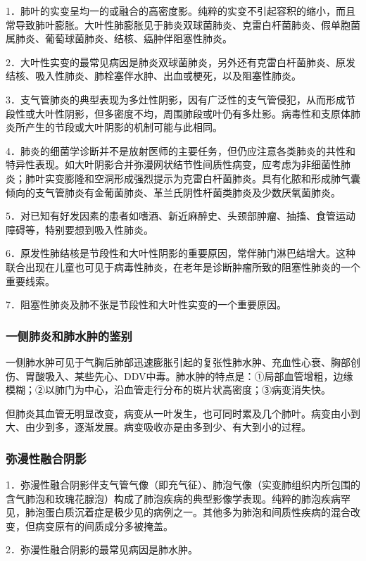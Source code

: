1．肺叶的实变呈均一的或融合的高密度影。纯粹的实变不引起容积的缩小，而且常导致肺叶膨胀。大叶性肺膨胀见于肺炎双球菌肺炎、克雷白杆菌肺炎、假单胞菌属肺炎、葡萄球菌肺炎、结核、癌肿伴阻塞性肺炎。

2．大叶性实变的最常见病因是肺炎双球菌肺炎，另外还有克雷白杆菌肺炎、原发结核、吸入性肺炎、肺栓塞伴水肿、出血或梗死，以及阻塞性肺炎。

3．支气管肺炎的典型表现为多灶性阴影，因有广泛性的支气管侵犯，从而形成节段性或大叶性阴影，但多密度不均，周围肺段或叶仍有多灶影。病毒性和支原体肺炎所产生的节段或大叶阴影的机制可能与此相同。

4．肺炎的细菌学诊断并不是放射医师的主要任务，但仍应注意各类肺炎的共性和特异性表现。如大叶阴影合并弥漫网状结节性间质性病变，应考虑为非细菌性肺炎；肺叶实变膨隆和空洞形成强烈提示为克雷白杆菌肺炎。具有化脓和形成肺气囊倾向的支气管肺炎有金葡菌肺炎、革兰氏阴性杆菌类肺炎及少数厌氧菌肺炎。

5．对已知有好发因素的患者如嗜酒、新近麻醉史、头颈部肿瘤、抽搐、食管运动障碍等，特别要想到吸入性肺炎。

6．原发性肺结核是节段性和大叶性阴影的重要原因，常伴肺门淋巴结增大。这种联合出现在儿童也可见于病毒性肺炎，在老年是诊断肿瘤所致的阻塞性肺炎的一个重要线索。

7．阻塞性肺炎及肺不张是节段性和大叶性实变的一个重要原因。

\subsubsection{一侧肺炎和肺水肿的鉴别}

一侧肺水肿可见于气胸后肺部迅速膨胀引起的复张性肺水肿、充血性心衰、胸部创伤、胃酸吸入、某些先心、DDV中毒。肺水肿的特点是：①局部血管增粗，边缘模糊；②以肺门为中心，沿血管走行分布的斑片状高密度；③病变消失快。

但肺炎其血管无明显改变，病变从一叶发生，也可同时累及几个肺叶。病变由小到大、由少到多，逐渐发展。病变吸收亦是由多到少、有大到小的过程。

\subsubsection{弥漫性融合阴影}

1．弥漫性融合阴影伴支气管气像（即充气征）、肺泡气像（实变肺组织内所包围的含气肺泡和玫瑰花腺泡）构成了肺泡疾病的典型影像学表现。纯粹的肺泡疾病罕见，肺泡蛋白质沉着症是极少见的病例之一。其他多为肺泡和间质性疾病的混合改变，但病变原有的间质成分多被掩盖。

2．弥漫性融合阴影的最常见病因是肺水肿。

